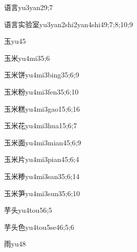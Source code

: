 \begin{verbete}{语言}{yu3yan2}{9;7}
\end{verbete}
\begin{verbete}{语言实验室}{yu3yan2shi2yan4shi4}{9;7;8;10;9}
\end{verbete}
\begin{verbete}{玉}{yu4}{5}
\end{verbete}
\begin{verbete}{玉米}{yu4mi3}{5;6}
\end{verbete}
\begin{verbete}{玉米饼}{yu4mi3bing3}{5;6;9}
\end{verbete}
\begin{verbete}{玉米粉}{yu4mi3fen3}{5;6;10}
\end{verbete}
\begin{verbete}{玉米糕}{yu4mi3gao1}{5;6;16}
\end{verbete}
\begin{verbete}{玉米花}{yu4mi3hua1}{5;6;7}
\end{verbete}
\begin{verbete}{玉米面}{yu4mi3mian4}{5;6;9}
\end{verbete}
\begin{verbete}{玉米片}{yu4mi3pian4}{5;6;4}
\end{verbete}
\begin{verbete}{玉米糁}{yu4mi3san3}{5;6;14}
\end{verbete}
\begin{verbete}{玉米笋}{yu4mi3sun3}{5;6;10}
\end{verbete}
\begin{verbete}{芋头}{yu4tou5}{6;5}
\end{verbete}
\begin{verbete}{芋头色}{yu4tou5se4}{6;5;6}
\end{verbete}
\begin{verbete}{雨}{yu4}{8}
\end{verbete}

